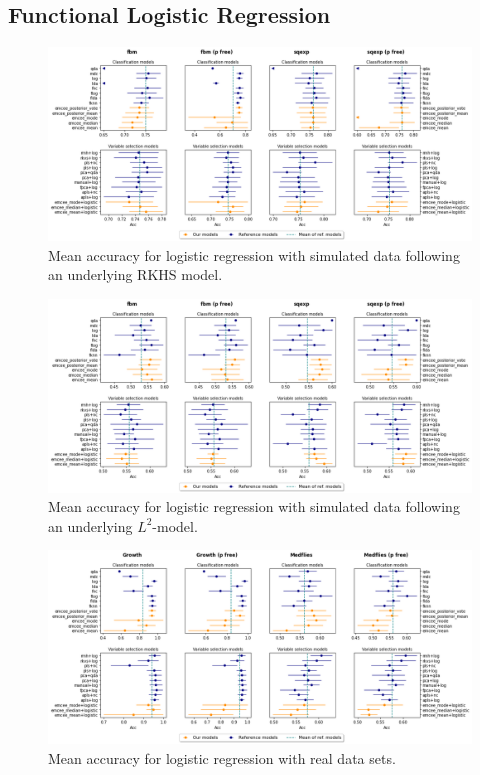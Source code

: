 \documentclass[ba]{imsart}
\numberwithin{equation}{section}
\theoremstyle{plain}
\begin{document}
\subsection{Functional Logistic Regression}

\begin{figure}[ht!]
  \centering
  \includegraphics[width=\textwidth]{img/clf_emcee_rkhs}
  \caption{Mean accuracy for logistic regression with simulated data following an underlying RKHS model.}\label{fig:clf-emcee-rkhs}
\end{figure}

\begin{figure}[ht!]
  \centering
  \includegraphics[width=\textwidth]{img/clf_emcee_l2}
  \caption{Mean accuracy for logistic regression with simulated data following an underlying \(L^2\)-model.}\label{fig:clf-emcee-l2}
\end{figure}

\begin{figure}[ht!]
  \centering
  \includegraphics[width=\textwidth]{img/clf_emcee_real}
  \caption{Mean accuracy for logistic regression with real data sets.}\label{fig:clf-emcee-real}
\end{figure}
\end{document}
